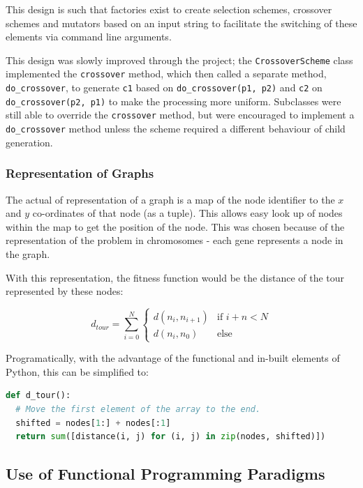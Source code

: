 \documentclass[10pt, a4paper]{article}
\begin{document}
This design is such that factories exist to create selection schemes, crossover
schemes and mutators based on an input string to facilitate the switching of
these elements via command line arguments.

This design was slowly improved through the project; the
\texttt{CrossoverScheme} class implemented the \texttt{crossover} method, 
which then called a separate method, \texttt{do\_crossover}, to generate 
\texttt{c1} based on \texttt{do\_crossover(p1, p2)} and \texttt{c2} on 
\texttt{do\_crossover(p2, p1)} to make the processing more uniform. Subclasses
were still able to override the \texttt{crossover} method, but were encouraged
to implement a \texttt{do\_crossover} method unless the scheme required a
different behaviour of child generation.


\subsubsection{Representation of Graphs}

The actual of representation of a graph is a map of the node identifier to the
$x$ and $y$ co-ordinates of that node (as a tuple). This allows easy look up 
of nodes within the map to get the position of the node. This was chosen 
because of the representation of the problem in chromosomes - each gene 
represents a node in the graph.

With this representation, the fitness function would be the distance of the 
tour represented by these nodes:

\begin{equation}
d_{tour} = \sum^{N}_{i=0}{
  \begin{cases}
    d(n_i, n_{i+1}) & \text{if } i+n < N \\ 
    d(n_i, n_0)     & \text{else}
  \end{cases}
}
\end{equation}

Programatically, with the advantage of the functional and in-built elements of 
Python, this can be simplified to:

\lstset{language=Python}
\begin{lstlisting}[language=Python, caption=Distance of a tour]
def d_tour():
  # Move the first element of the array to the end.
  shifted = nodes[1:] + nodes[:1]
  return sum([distance(i, j) for (i, j) in zip(nodes, shifted)])
\end{lstlisting}

\subsection{Use of Functional Programming Paradigms}
\end{document}
